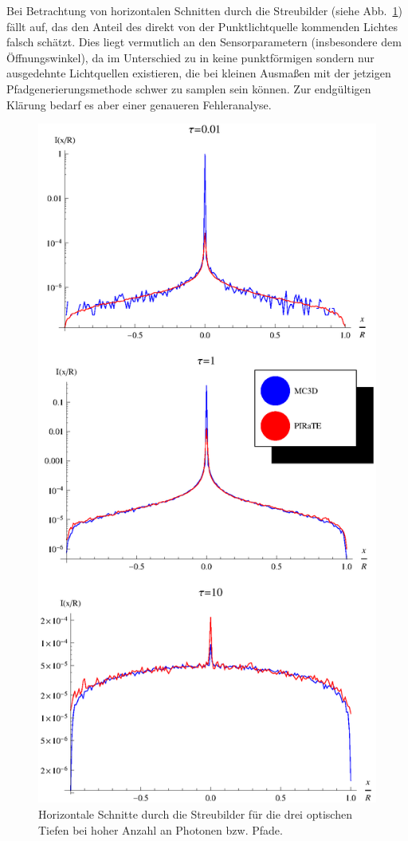 	Bei Betrachtung von horizontalen Schnitten durch die Streubilder (siehe Abb.~\ref{fig:sphere_image_cuts}) fällt auf, das \pirate den Anteil des direkt von der Punktlichtquelle kommenden Lichtes falsch schätzt. Dies liegt vermutlich an den Sensorparametern (insbesondere dem Öffnungswinkel), da im Unterschied zu \mctd in \pirate keine punktförmigen sondern nur ausgedehnte Lichtquellen existieren, die bei kleinen Ausmaßen mit der jetzigen Pfadgenerierungsmethode schwer zu samplen sein können. Zur endgültigen Klärung bedarf es aber einer genaueren Fehleranalyse.
	
		\begin{figure}
			\centering
			\includegraphics[height=1.0\textheight]{sphere_image_cuts.eps}
			\caption{Horizontale Schnitte durch die Streubilder für die drei optischen Tiefen bei hoher Anzahl an Photonen bzw. Pfade.}
			\label{fig:sphere_image_cuts}
		\end{figure}
	
